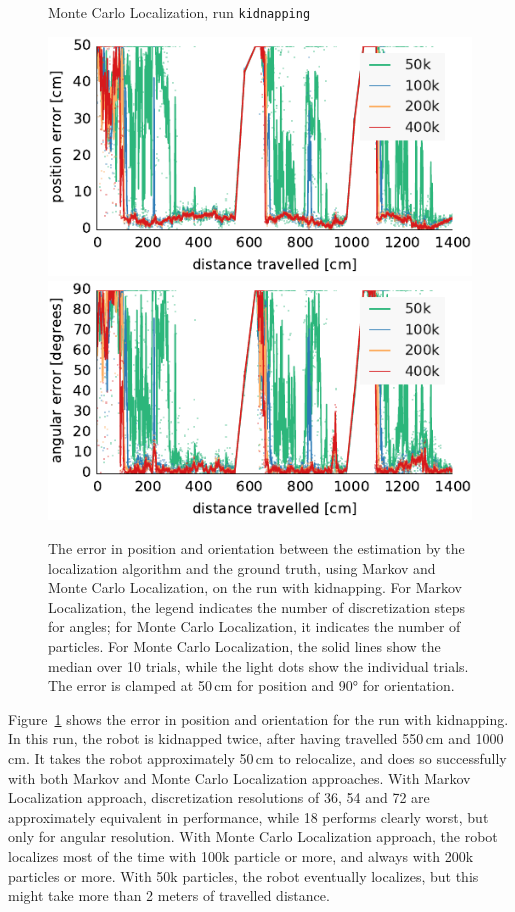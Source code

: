 \documentclass[letterpaper, 10pt, conference]{ieeeconf}
\newcommand{\Fig}[1]{Figure~\ref{fig:#1}}
\begin{document}
\begin{figure}
\begin{center}
Monte Carlo Localization, run \texttt{kidnapping}
\end{center}
\includegraphics{mcl-whole_random_long-xy}\hfill
\includegraphics{mcl-whole_random_long-theta}

\caption{The error in position and orientation between the estimation by the localization algorithm and the ground truth, using Markov and Monte Carlo Localization, on the run with kidnapping.
For Markov Localization, the legend indicates the number of discretization steps for angles; for Monte Carlo Localization, it indicates the number of particles.
For Monte Carlo Localization, the solid lines show the median over 10 trials, while the light dots show the individual trials.
The error is clamped at 50\,cm for position and 90° for orientation.}
\label{fig:whole-runs-random-long}
\end{figure}

\Fig{whole-runs-random-long} shows the error in position and orientation for the run with kidnapping.
In this run, the robot is kidnapped twice, after having travelled 550\,cm and 1000\,cm.
It takes the robot approximately 50\,cm to relocalize, and does so successfully with both Markov and Monte Carlo Localization approaches.
With Markov Localization approach, discretization resolutions of 36, 54 and 72 are approximately equivalent in performance, while 18 performs clearly worst, but only for angular resolution.
With Monte Carlo Localization approach, the robot localizes most of the time with 100k particle or more, and always with 200k particles or more.
With 50k particles, the robot eventually localizes, but this might take more than 2 meters of travelled distance.
\end{document}
